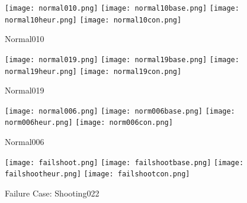 \documentclass[sigplan,authorversion,nonacm, 9pt]{acmart}
\begin{document}
\begin{figure*}[h]
    \centering
    \begin{minipage}[b]{\textwidth}
        \centering
        \texttt{[image: normal010.png]}
        \texttt{[image: normal10base.png]}
        \texttt{[image: normal10heur.png]}
        \texttt{[image: normal10con.png]}
        \caption{Normal010}
        \label{fig:normal010}
    \end{minipage}
\end{figure*}
\begin{figure*}[h]
    \centering
    \begin{minipage}[b]{\textwidth}
        \centering
        \texttt{[image: normal019.png]}
        \texttt{[image: normal19base.png]}
        \texttt{[image: normal19heur.png]}
        \texttt{[image: normal19con.png]}
        \caption{Normal019}
        \label{fig:normal019}
    \end{minipage}
\end{figure*}
\begin{figure*}[h]
    \centering
    \begin{minipage}[b]{\textwidth}
        \centering
        \texttt{[image: normal006.png]}
        \texttt{[image: norm006base.png]}
        \texttt{[image: norm006heur.png]}
        \texttt{[image: norm006con.png]}
        \caption{Normal006}
        \label{fig:normal006}
    \end{minipage}
\end{figure*}
\begin{figure*}[h]
    \centering
    \begin{minipage}[b]{\textwidth}
        \centering
        \texttt{[image: failshoot.png]}
        \texttt{[image: failshootbase.png]}
        \texttt{[image: failshootheur.png]}
        \texttt{[image: failshootcon.png]}
        \caption{Failure Case: Shooting022}
        \label{fig:failshooting022}
    \end{minipage}
\end{figure*}
\end{document}
